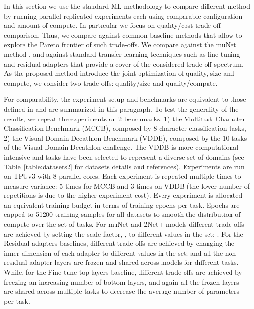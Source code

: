 \documentclass{article} \usepackage{iclr2023_conference,times}
\newcommand{\method}{2Net+\xspace}
\begin{document}
In this section we use the standard ML methodology to 
compare different method by running parallel replicated experiments each using comparable configuration and amount of compute.
In particular we focus on quality/cost trade-off comparison.
Thus, we compare against common baseline methods that allow to explore the Pareto frontier of such trade-offs.
We compare against the muNet method \citep{Gesmundo2022munet1}, and against standard transfer learning techniques such as fine-tuning and residual adapters that provide a cover of the considered
trade-off spectrum.
As the proposed method introduce the joint optimization of quality, size and compute,
we consider two trade-offs: quality/size and quality/compute.


For comparability, the experiment setup and benchmarks are equivalent to those defined in \cite{Gesmundo2022munet1} and are summarized in this paragraph.
To test the generality of the results, we repeat the experiments on 2 benchmarks:
1) the Multitask Character Classification Benchmark (MCCB), composed by 8 character classification tasks,
2) the Visual Domain Decathlon Benchmark (VDDB), composed by the 10 tasks of the Visual Domain Decathlon challenge. The VDDB is more computational intensive and tasks have been selected to represent a diverse set of domains (see Table~\ref{table:datasets2} for datasets details and references).
Experiments are run on TPUv3 with 8 parallel cores. Each experiment is repeated multiple times to measure variance: 5 times for MCCB and 3 times on VDDB (the lower number of repetitions is due to the higher experiment cost).
Every experiment is allocated an equivalent training budget in terms of training epochs per task. Epochs are capped to 51200 training samples for all datasets to smooth the distribution of compute over the set of tasks.
For muNet and \method models different trade-offs are achieved by setting the scale factor, , to different values in the set: .
For the Residual adapters baselines, different trade-offs are achieved by changing the inner dimension of each adapter to different values in the set:  and all the non residual adapter layers are frozen and shared across models for different tasks.
While, for the Fine-tune top layers baseline, different trade-offs are achieved by freezing an increasing number of bottom layers, and again all the frozen layers are shared across multiple tasks to decrease the average number of parameters per task.
\end{document}

